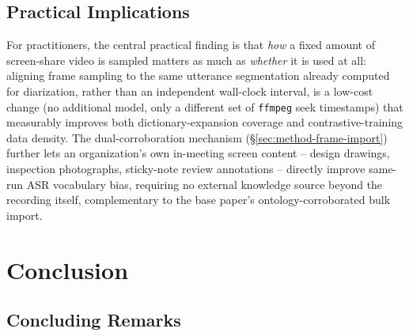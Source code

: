 ﻿\documentclass[twocolumn]{article}
\begin{document}
\subsection{Practical Implications}

For practitioners, the central practical finding is that \emph{how} a fixed amount of screen-share
video is sampled matters as much as \emph{whether} it is used at all: aligning frame sampling to the
same utterance segmentation already computed for diarization, rather than an independent wall-clock
interval, is a low-cost change (no additional model, only a different set of \texttt{ffmpeg} seek
timestamps) that measurably improves both dictionary-expansion coverage and contrastive-training
data density. The dual-corroboration mechanism (\S\ref{sec:method-frame-import}) further lets an
organization's own in-meeting screen content -- design drawings, inspection photographs,
sticky-note review annotations -- directly improve same-run ASR vocabulary bias, requiring no
external knowledge source beyond the recording itself, complementary to the base paper's
ontology-corroborated bulk import.

\section{Conclusion}
\label{sec:conclusion}

\subsection{Concluding Remarks}
\end{document}

